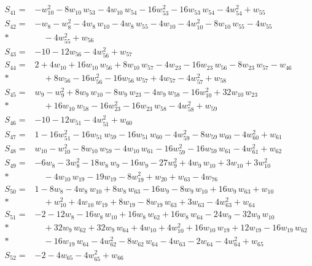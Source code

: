 \begin{align*}
S_{41}={}& -w_{10}^{2} - 8w_{10}\,w_{53} - 4w_{10}\,w_{54} - 16w_{53}^{2} - 16w_{53}\,w_{54} - 4w_{54}^{2} + w_{55} \\[2pt]
S_{42}={}& -w_{8} - w_{8}^{2} - 4w_{8}\,w_{10} - 4w_{8}\,w_{55} - 4w_{10} - 4w_{10}^{2} - 8w_{10}\,w_{55} - 4w_{55} \\*
&\quad  - 4w_{55}^{2} + w_{56} \\[2pt]
S_{43}={}& -10 - 12w_{56} - 4w_{56}^{2} + w_{57} \\[2pt]
S_{44}={}& 2 + 4w_{10} + 16w_{10}\,w_{56} + 8w_{10}\,w_{57} - 4w_{23} - 16w_{23}\,w_{56} - 8w_{23}\,w_{57} - w_{46} \\*
&\quad  + 8w_{56} - 16w_{56}^{2} - 16w_{56}\,w_{57} + 4w_{57} - 4w_{57}^{2} + w_{58} \\[2pt]
S_{45}={}& w_{9} - w_{9}^{2} + 8w_{9}\,w_{10} - 8w_{9}\,w_{23} - 4w_{9}\,w_{58} - 16w_{10}^{2} + 32w_{10}\,w_{23} \\*
&\quad  + 16w_{10}\,w_{58} - 16w_{23}^{2} - 16w_{23}\,w_{58} - 4w_{58}^{2} + w_{59} \\[2pt]
S_{46}={}& -10 - 12w_{51} - 4w_{51}^{2} + w_{60} \\[2pt]
S_{47}={}& 1 - 16w_{51}^{2} - 16w_{51}\,w_{59} - 16w_{51}\,w_{60} - 4w_{59}^{2} - 8w_{59}\,w_{60} - 4w_{60}^{2} + w_{61} \\[2pt]
S_{48}={}& w_{10} - w_{10}^{2} - 8w_{10}\,w_{59} - 4w_{10}\,w_{61} - 16w_{59}^{2} - 16w_{59}\,w_{61} - 4w_{61}^{2} + w_{62} \\[2pt]
S_{49}={}& -6w_{8} - 3w_{8}^{2} - 18w_{8}\,w_{9} - 16w_{9} - 27w_{9}^{2} + 4w_{9}\,w_{10} + 3w_{10} + 3w_{10}^{2} \\*
&\quad  - 4w_{10}\,w_{19} - 19w_{19} - 8w_{19}^{2} + w_{20} + w_{63} - 4w_{76} \\[2pt]
S_{50}={}& 1 - 8w_{8} - 4w_{8}\,w_{10} + 8w_{8}\,w_{63} - 16w_{9} - 8w_{9}\,w_{10} + 16w_{9}\,w_{63} + w_{10} \\*
&\quad  + w_{10}^{2} + 4w_{10}\,w_{19} + 8w_{19} - 8w_{19}\,w_{63} + 3w_{63} - 4w_{63}^{2} + w_{64} \\[2pt]
S_{51}={}& -2 - 12w_{8} - 16w_{8}\,w_{10} + 16w_{8}\,w_{62} + 16w_{8}\,w_{64} - 24w_{9} - 32w_{9}\,w_{10} \\*
&\quad  + 32w_{9}\,w_{62} + 32w_{9}\,w_{64} + 4w_{10} + 4w_{10}^{2} + 16w_{10}\,w_{19} + 12w_{19} - 16w_{19}\,w_{62} \\*
&\quad  - 16w_{19}\,w_{64} - 4w_{62}^{2} - 8w_{62}\,w_{64} - 4w_{63} - 2w_{64} - 4w_{64}^{2} + w_{65} \\[2pt]
S_{52}={}& -2 - 4w_{65} - 4w_{65}^{2} + w_{66} \\[2pt]

\end{align*}
